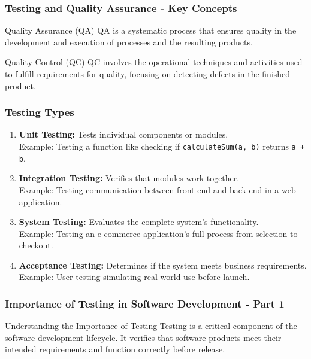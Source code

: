 \documentclass{beamer}
\begin{document}
\begin{frame}[fragile]
    \frametitle{Testing and Quality Assurance - Key Concepts}
    \begin{block}{Quality Assurance (QA)}
        QA is a systematic process that ensures quality in the development and execution of processes and the resulting products.
    \end{block}

    \begin{block}{Quality Control (QC)}
        QC involves the operational techniques and activities used to fulfill requirements for quality, focusing on detecting defects in the finished product.
    \end{block}
\end{frame}

\begin{frame}[fragile]
    \frametitle{Testing Types}
    \begin{enumerate}
        \item \textbf{Unit Testing:} Tests individual components or modules. \\
            Example: Testing a function like checking if \texttt{calculateSum(a, b)} returns \texttt{a + b}.
        \item \textbf{Integration Testing:} Verifies that modules work together. \\
            Example: Testing communication between front-end and back-end in a web application.
        \item \textbf{System Testing:} Evaluates the complete system's functionality. \\
            Example: Testing an e-commerce application's full process from selection to checkout.
        \item \textbf{Acceptance Testing:} Determines if the system meets business requirements. \\
            Example: User testing simulating real-world use before launch.
    \end{enumerate}
\end{frame}

\begin{frame}[fragile]
    \frametitle{Importance of Testing in Software Development - Part 1}
    \begin{block}{Understanding the Importance of Testing}
        Testing is a critical component of the software development lifecycle. It verifies that software products meet their intended requirements and function correctly before release.
    \end{block}
\end{frame}
\end{document}

